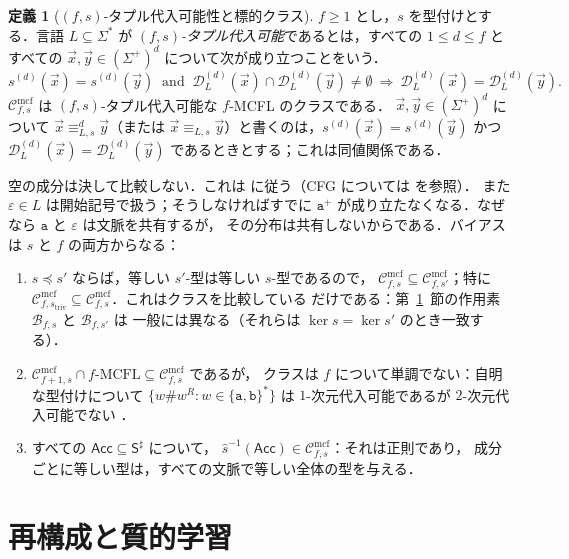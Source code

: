 \documentclass[11pt,a4paper]{ltjsarticle}
\numberwithin{equation}{section}
\theoremstyle{plain}
\theoremstyle{definition}
\newtheorem{definition}[theorem]{定義}
\theoremstyle{remark}
\newcommand{\Cmcf}[2]{\mathcal{C}^{\mathrm{mcf}}_{#1,#2}}
\newcommand{\D}{\mathcal{D}}
\newcommand{\tuple}[1]{\vec{#1}}
\newcommand{\eps}{\varepsilon}
\theoremstyle{plain}
\begin{document}
\begin{definition}[$(f,s)$-タプル代入可能性と標的クラス]
\label{def:tuple-substitutable}
\label{def:class-cmcf}
$f\ge1$ とし，$s$ を型付けとする．言語 $L\subseteq\Sigma^*$ が
\emph{$(f,s)$-タプル代入可能}であるとは，すべての $1\le d\le f$ とすべての
$\tuple x,\tuple y\in(\Sigma^+)^d$ について次が成り立つことをいう．
\[
 s^{(d)}(\tuple x)=s^{(d)}(\tuple y)\ \text{ and }\
 \D_L^{(d)}(\tuple x)\cap\D_L^{(d)}(\tuple y)\ne\emptyset
 \ \Longrightarrow\
 \D_L^{(d)}(\tuple x)=\D_L^{(d)}(\tuple y).
\]
$\Cmcf{f}{s}$ は $(f,s)$-タプル代入可能な $f$-MCFL のクラスである．
$\tuple x,\tuple y\in(\Sigma^+)^d$ について $\tuple x\equiv_{L,s}^d\tuple y$（または
$\tuple x\equiv_{L,s}\tuple y$）と書くのは，$s^{(d)}(\tuple x)=s^{(d)}(\tuple y)$ かつ
$\D_L^{(d)}(\tuple x)=\D_L^{(d)}(\tuple y)$ であるときとする；これは同値関係である．
\end{definition}

空の成分は決して比較しない．これは
\cite[Section~3.1 and footnote~3]{Yoshinaka2011} に従う（CFG については \cite{Clark2013} を参照）．
また $\eps\in L$ は開始記号で扱う；そうしなければすでに
$\mathtt a^+$ が成り立たなくなる．なぜなら $\mathtt a$ と $\eps$ は文脈を共有するが，
その分布は共有しないからである．バイアスは $s$ と $f$ の両方からなる：
\begin{enumerate}[label=\textup{(\alph*)},leftmargin=*]
\item $s\preceq s'$ ならば，等しい $s'$-型は等しい $s$-型であるので，
$\Cmcf{f}{s}\subseteq\Cmcf{f}{s'}$；特に
$\Cmcf{f}{s_{\mathrm{triv}}}\subseteq\Cmcf{f}{s}$．これはクラスを比較している
だけである：第~\ref{sec:learner}~節の作用素 $\mathcal B_{f,s}$ と $\mathcal B_{f,s'}$ は
一般には異なる（それらは
$\ker s=\ker s'$ のとき一致する）．
\item $\Cmcf{f+1}{s}\cap f\text{-}\mathrm{MCFL}\subseteq\Cmcf{f}{s}$ であるが，
クラスは $f$ について単調でない：自明な型付けについて
$\{w\mathtt{\#}w^R:w\in\{\mathtt a,\mathtt b\}^*\}$ は
$1$-次元代入可能であるが $2$-次元代入可能でない
\cite[Section~3.1, Example~5]{Yoshinaka2011}．
\item すべての $\mathsf{Acc}\subseteq\mathsf S^\sharp$ について，
$\widehat{s}^{-1}(\mathsf{Acc})\in\Cmcf{f}{s}$：それは正則であり，
成分ごとに等しい型は，すべての文脈で等しい全体の型を与える．
\end{enumerate}

\section{再構成と質的学習}
\label{sec:learner}
\end{document}
